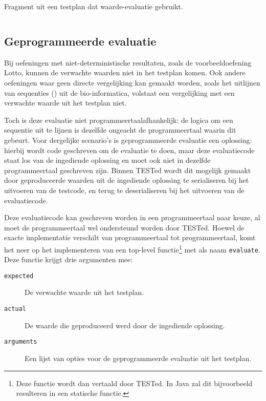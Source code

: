 \begin{listing}[h]
    \caption{Fragment uit een testplan dat waarde-evaluatie gebruikt.}
    \label{lst:testplan-value}
    \inputminted{json}{code/testplan-value.json}
\end{listing}

\subsection{Geprogrammeerde evaluatie}\label{subsec:geprogrammeerde-evaluatie}

Bij oefeningen met niet-deterministische resultaten, zoals de voorbeeldoefening Lotto, kunnen de verwachte waarden niet in het testplan komen.
Ook andere oefeningen waar geen directe vergelijking kan gemaakt worden, zoals het uitlijnen van sequenties () uit de bio-informatica, volstaat een vergelijking met een verwachte waarde uit het testplan niet.

Toch is deze evaluatie niet programmeertaalafhankelijk: de logica om een sequentie uit te lijnen is dezelfde ongeacht de programmeertaal waarin dit gebeurt.
Voor dergelijke scenario's is geprogrammeerde evaluatie een oplossing: hierbij wordt code geschreven om de evaluatie te doen, maar deze evaluatiecode staat los van de ingediende oplossing en moet ook niet in dezelfde programmeertaal geschreven zijn.
Binnen TESTed wordt dit mogelijk gemaakt door geproduceerde waarden uit de ingediende oplossing te serialiseren bij het uitvoeren van de testcode, en terug te deserialiseren bij het uitvoeren van de evaluatiecode.

Deze evaluatiecode kan geschreven worden in een programmeertaal naar keuze, al moet de programmeertaal wel ondersteund worden door TESTed.
Hoewel de exacte implementatie verschilt van programmeertaal tot programmeertaal, komt het neer op het implementeren van een top-level functie\footnote{
    Deze functie wordt dan vertaald door TESTed.
    In Java zal dit bijvoorbeeld resulteren in een statische functie.
} met als naam \texttt{evaluate}.
Deze functie krijgt drie argumenten mee:

\begin{description}
    \item[\texttt{expected}] De verwachte waarde uit het testplan.
    \item[\texttt{actual}] De waarde die geproduceerd werd door de ingediende oplossing.
    \item[\texttt{arguments}] Een lijst van opties voor de geprogrammeerde evaluatie uit het testplan.
\end{description}

